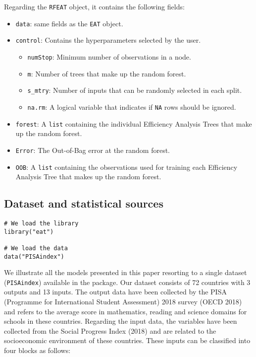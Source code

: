 Regarding the \texttt{RFEAT} object, it contains the following fields:

\begin{itemize}
\item
  \texttt{data}: same fields as the \texttt{EAT} object.
\item
  \texttt{control}: Contains the hyperparameters selected by the user.

  \begin{itemize}
  \tightlist
  \item
    \texttt{numStop}: Minimum number of observations in a node.
  \item
    \texttt{m}: Number of trees that make up the random forest.
  \item
    \texttt{s\_mtry}: Number of inputs that can be randomly selected in each split.
  \item
    \texttt{na.rm}: A logical variable that indicates if \texttt{NA} rows should be ignored.
  \end{itemize}
\item
  \texttt{forest}: A \texttt{list} containing the individual Efficiency Analysis Trees that make up the random forest.
\item
  \texttt{Error}: The Out-of-Bag error at the random forest.
\item
  \texttt{OOB}: A \texttt{list} containing the observations used for training each Efficiency Analysis Tree that makes up the random forest.
\end{itemize}

\hypertarget{section3.1}{%
\subsection{Dataset and statistical sources}\label{section3.1}}

\begin{verbatim}
# We load the library
library("eat")

# We load the data
data("PISAindex")
\end{verbatim}

We illustrate all the models presented in this paper resorting to a single dataset (\texttt{PISAindex}) available in the  package. Our dataset consists of 72 countries with 3 outputs and 13 inputs. The output data have been collected by the PISA (Programme for International Student Assessment) 2018 survey (OECD 2018) and refers to the average score in mathematics, reading and science domains for schools in these countries. Regarding the input data, the variables have been collected from the Social Progress Index (2018) and are related to the socioeconomic environment of these countries. These inputs can be classified into four blocks as follows:

